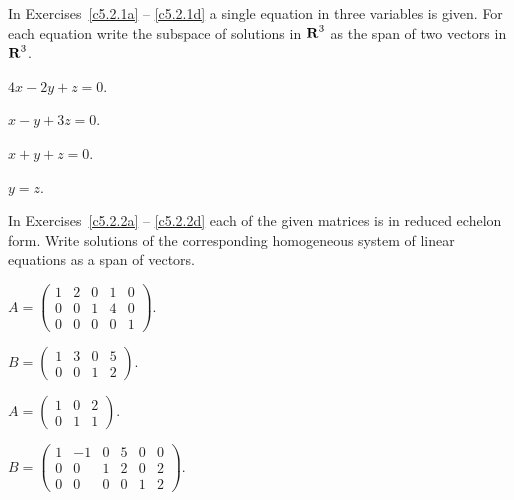 \EXER

\TEXER

\noindent In Exercises~\ref{c5.2.1a} -- \ref{c5.2.1d} a single equation in
three variables is given.  For each equation write the subspace of solutions
in $\mbox{$\bf{R}$}^3$ as the span of two vectors in $\mbox{$\bf{R}$}^3$.
\begin{exercise} \label{c5.2.1a}
$4x - 2y + z = 0$.
\end{exercise}
\begin{exercise} \label{c5.2.1b}
$x - y + 3z = 0$.
\end{exercise}
\begin{exercise} \label{c5.2.1c}
$x + y + z = 0$.
\end{exercise}
\begin{exercise} \label{c5.2.1d}
$y=z$.
\end{exercise}

\noindent In Exercises~\ref{c5.2.2a} -- \ref{c5.2.2d} each of the
given matrices is in reduced echelon form.  Write solutions of the
corresponding homogeneous system of linear equations as a span of vectors.
\begin{exercise} \label{c5.2.2a}
$A = \left(\begin{array}{rrrrr} 1 & 2 & 0 & 1 & 0 \\
	0 & 0 & 1 & 4 & 0 \\ 0 & 0 & 0 & 0 & 1 \end{array}\right)$.
\end{exercise}
\begin{exercise} \label{c5.2.2b}
$B = \left(\begin{array}{rrrr} 1 & 3 & 0 & 5 \\
	0 & 0 & 1 & 2 \end{array}\right)$.
\end{exercise}

\begin{exercise} \label{c5.2.2c}
$A = \left(\begin{array}{rrr} 1 & 0 & 2 \\
        0 & 1 & 1\end{array}\right)$.
\end{exercise}
\begin{exercise} \label{c5.2.2d}
$B = \left(\begin{array}{rrrrrr} 1 & -1 & 0 & 5 & 0 & 0\\
        0 & 0 & 1 & 2 & 0 & 2\\
        0 & 0 & 0 & 0 & 1 & 2\end{array}\right)$.
\end{exercise}

